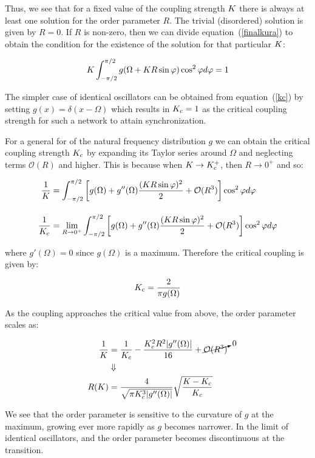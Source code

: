 Thus, we see that for a fixed value of the coupling strength $K$ there is always at least one solution for the order parameter $R$.
The trivial (disordered) solution is given by $R=0$. If $R$ is non-zero, then we can divide equation~(\ref{finalkura}) to obtain the
condition for the existence of the solution for that particular $K$:

\begin{align}
     K\int_{-\pi/2}^{\pi/2} g(\Omega + K R \sin\varphi) \cos^2\varphi d\varphi = 1
     \label{kc}
\end{align}

The simpler case of identical oscillators can be obtained from equation~(\ref{kc}) by setting $g(x) = \delta(x-\Omega)$ which results
in $K_c = 1$ as the critical coupling strength for such a network to attain synchronization.

For a general for of the natural frequency distribution $g$ we can obtain the critical coupling strength $K_c$ by expanding its
Taylor series around $\Omega$ and neglecting terms $\mathcal{O}(R)$ and higher. This is because when $K \to K_c^+$, then $R \to
0^+$ and so:

\begin{align}
    \frac{1}{K} &= \int_{-\pi/2}^{\pi/2} \left[ g(\Omega) + g''(\Omega)\frac{(K R \sin\varphi)^2}{2} + \mathcal{O}(R^3) \right] \cos^2\varphi d\varphi \\[10pt]
    \frac{1}{K_c} &= \lim_{R\to0^+} \int_{-\pi/2}^{\pi/2} \left[ g(\Omega) + g''(\Omega)\frac{(K R \sin\varphi)^2}{2} + \mathcal{O}(R^3) \right] \cos^2\varphi d\varphi
\end{align}

\noindent where $g'(\Omega)=0$ since $g(\Omega)$ is a maximum. Therefore the critical coupling is given by:

\begin{align}
    K_c = \frac{2}{\pi g(\Omega)}
\end{align}

As the coupling approaches the critical value from above, the order parameter scales as:

\begin{align}
    \frac{1}{K} &= \frac{1}{K_c} - \frac{K_c^2 R^2|g''(\Omega)| }{16} + \cancelto{0}{\mathcal{O}(R^3)} \notag\\
                  &\Downarrow \notag \\
    R(K) &= \frac{4}{\sqrt{\pi K_c^3|g''(\Omega)|}} \sqrt{\frac{K - K_c}{K_c}}
\end{align}

We see that the order parameter is sensitive to the curvature of $g$ at the maximum, growing ever more rapidly as $g$ becomes narrower.
In the limit of identical oscillators, and the order parameter becomes discontinuous at the transition.


